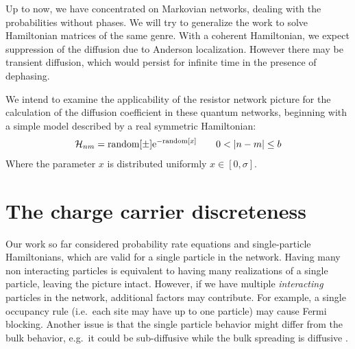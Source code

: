 Up to now, we have concentrated on Markovian networks, dealing with the probabilities without phases.
We will try to generalize the work to solve Hamiltonian matrices of the same genre.
With a coherent Hamiltonian, 
we expect suppression of the diffusion due to Anderson localization.
However there may be transient diffusion, which would persist 
for infinite time in the presence of dephasing.

We intend to examine the applicability of the resistor network picture for 
the calculation of the diffusion coefficient in these quantum networks, beginning with
a simple model described by a real symmetric Hamiltonian:
%
\begin{align}
  \mathcal{H}_{nm} = \textrm{random}[\pm] \eexp{-\textrm{random}[x]} \qquad 0<|n-m|\le b
\end{align}
%
Where the parameter $x$ is distributed uniformly $x\in [0,\sigma]$. 


\section{The charge carrier discreteness}\label{sec:discreteness}

Our work so far considered probability rate equations and single-particle Hamiltonians, which are valid 
for a single particle in the network.
Having many non interacting particles is equivalent to having many 
realizations of a single particle, leaving the picture intact. 
However, if we have multiple \emph{interacting} particles in the network, 
additional factors may contribute. For example, a single occupancy rule 
(i.e.\ each site may have up to one particle) may cause Fermi blocking. 
Another issue is that the single particle behavior might differ from
the bulk behavior, e.g.\ it could be sub-diffusive 
while the bulk spreading is diffusive \cite{richards_theory_1977,hung_diffusion_2012}.




